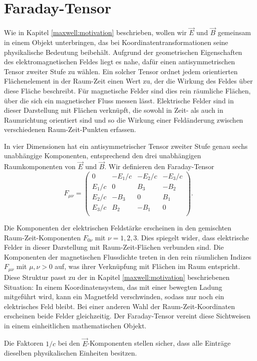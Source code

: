 \section{Faraday-Tensor}
\label{maxwell:faraday}
Wie in Kapitel \ref{maxwell:motivation} beschrieben, wollen wir $\vec{E}$ und $\vec{B}$ gemeinsam in einem Objekt unterbringen, das bei Koordinatentransformationen seine physikalische Bedeutung beibehält. Aufgrund der geometrischen Eigenschaften des elektromagnetischen Feldes liegt es nahe, dafür einen antisymmetrischen Tensor zweiter Stufe zu wählen. Ein solcher Tensor ordnet jedem orientierten Flächenelement in der Raum-Zeit einen Wert zu, der die Wirkung des Feldes über diese Fläche beschreibt. Für magnetische Felder sind dies rein räumliche Flächen, über die sich ein magnetischer Fluss messen lässt. Elektrische Felder sind in dieser Darstellung mit Flächen verknüpft, die sowohl in Zeit- als auch in Raumrichtung orientiert sind und so die Wirkung einer Feldänderung zwischen verschiedenen Raum-Zeit-Punkten erfassen.

%

In vier Dimensionen hat ein antisymmetrischer Tensor zweiter Stufe genau sechs unabhängige Komponenten, entsprechend den drei unabhängigen Raumkomponenten von $\vec{E}$ und $\vec{B}$. Wir definieren den Faraday-Tensor
\[
F_{\mu\nu}
= 
\begin{pmatrix}
	0 & -E_1/c & -E_2/c & -E_3/c \\
	E_1/c &  0 &  B_3 & -B_2 \\
	E_2/c & -B_3 &  0 &  B_1 \\
	E_3/c &  B_2 & -B_1 &  0 \\
\end{pmatrix}.
\]

Die Komponenten der elektrischen Feldstärke erscheinen in den gemischten Raum-Zeit-Komponenten $F_{0\nu}$ mit $\nu=1,2,3$. Dies spiegelt wider, dass elektrische Felder in dieser Darstellung mit Raum-Zeit-Flächen verbunden sind. Die Komponenten der magnetischen Flussdichte treten in den rein räumlichen Indizes $F_{\mu\nu}$ mit $\mu,\nu>0$ auf, was ihrer Verknüpfung mit Flächen im Raum entspricht. Diese Struktur passt zu der in Kapitel \ref{maxwell:motivation} beschriebenen Situation: In einem Koordinatensystem, das mit einer bewegten Ladung mitgeführt wird, kann ein Magnetfeld verschwinden, sodass nur noch ein elektrisches Feld bleibt. Bei einer anderen Wahl der Raum-Zeit-Koordinaten erscheinen beide Felder gleichzeitig. Der Faraday-Tensor vereint diese Sichtweisen in einem einheitlichen mathematischen Objekt.

Die Faktoren $1/c$ bei den $\vec{E}$-Komponenten stellen sicher, dass alle Einträge dieselben physikalischen Einheiten besitzen.





